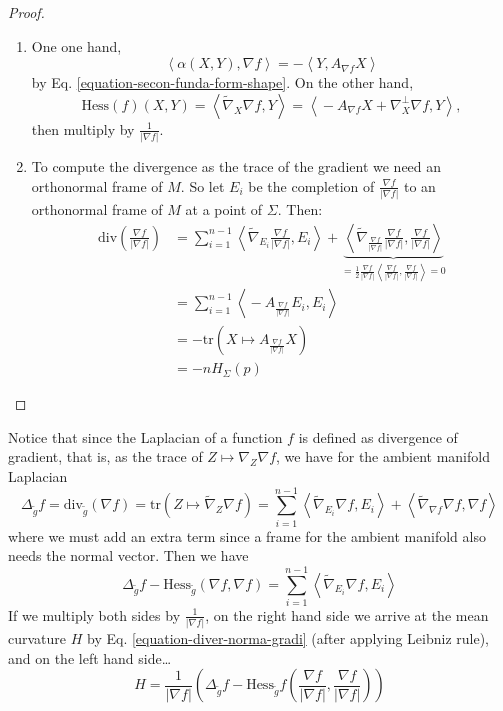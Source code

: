 \begin{proof}
\begin{enumerate}
\item One one hand,
 $$
\left\langle{}\alpha(X,Y),\nabla
f\right\rangle{}=-\left\langle{}Y,A_{\nabla f}X\right\rangle{}
$$
by Eq. \ref{equation-secon-funda-form-shape}.
On the other hand,
$$
\text{Hess}(f)(X,Y)=\left\langle{}\tilde{\nabla}_X
\nabla f,Y\right\rangle{}=
\left\langle{}-A_{\nabla f}X+\nabla_X^\perp \nabla
f,Y\right\rangle{},
$$
then multiply by $\frac{1}{|\nabla f|}$.

\item To compute the divergence as the trace
of the gradient we need an
orthonormal frame of $M$. So let $E_i$ be the
completion of
$\frac{\nabla f}{|\nabla f|}$ to an
orthonormal frame of $M$ at a point of
$\Sigma$. Then:
\begin{equation}
\label{equation-diver-norma-gradi}
\begin{aligned}
\text{div}\left(\frac{\nabla f}{|\nabla
f|}\right)
&=\sum_{i=1}^{n-1}
\left\langle{}\tilde{\nabla}_{E_i}\frac{\nabla
f}{|\nabla f|},E_i\right\rangle{}
+\underbrace{\left\langle{}\tilde{\nabla}
_{\frac{\nabla
f}{|\nabla f|}}
\frac{\nabla f}{|\nabla f|},\frac{\nabla
f}{|\nabla f|}\right\rangle{}}
_{=\frac{1}{2}\frac{\nabla f}{|\nabla f|}
\left\langle{}\frac{\nabla f}{|\nabla
f|},\frac{\nabla f}{|\nabla f|}\right\rangle{}=0}
\\
&=\sum_{i=1}^{n-1} \left\langle{}-A_{\frac{\nabla
f}{|\nabla f|}}E_i,E_i\right\rangle{}\\
&=-\text{tr}\left(X \mapsto A_{\frac{\nabla
f}{|\nabla f|}}X\right)\\
&=-nH_{\Sigma}(p)
\end{aligned}
\end{equation}
\end{enumerate}
\end{proof}

Notice that since the Laplacian of a function
$f$ is defined as divergence of
gradient, that is, as the trace of $Z\mapsto
\nabla_Z\nabla f$,
we have for the ambient manifold Laplacian
\begin{equation}
\label{equation-immersion-Laplacian}
\Delta_{\tilde{g}}
f=\text{div}_{\tilde{g}}(\nabla f)
=\text{tr}(Z \mapsto \tilde{\nabla}_Z\nabla
f)
=\sum_{i=1}^{n-1}\left\langle{}\tilde{\nabla}_{E_i}
\nabla
f,E_i\right\rangle{}
+\left\langle{}\tilde{\nabla}_{\nabla f}\nabla
f,\nabla f\right\rangle{}
\end{equation}
where we must add an extra term since a frame
for the ambient manifold
also needs the normal vector. Then we have
$$
\Delta_{\tilde{g}}f-\text{Hess}_{\tilde{g}}
(\nabla
f,\nabla f)
=\sum_{i=1}^{n-1}\left\langle{}\tilde{\nabla}_{E_i}
\nabla
f,E_i\right\rangle{}
$$
If we multiply both sides by
$\frac{1}{|\nabla f|}$, on the right hand
side we
arrive at the mean curvature $H$ by Eq.
\ref{equation-diver-norma-gradi} (after
applying Leibniz rule),
 and on the left hand side…
\begin{equation}
\label{equation-mean-curva-level-sets}
H=\frac{1}{|\nabla
f|}\left(\Delta_{\tilde{g}}
f-\text{Hess}_{\tilde{g}}f
\left(\frac{\nabla f}{|\nabla
f|},\frac{\nabla f}{|\nabla f|}\right)\right)
\end{equation}

